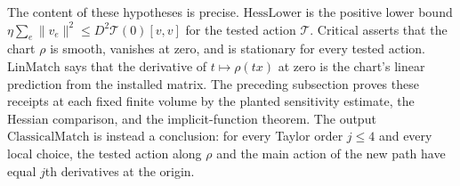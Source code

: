 The content of these hypotheses is precise. $\mathrm{HessLower}$ is the
positive lower bound
$\eta\sum_e\|v_e\|^2\leq D^2\mathcal T(0)[v,v]$ for the tested action
$\mathcal T$.
$\mathrm{Critical}$ asserts that the chart $\rho$ is smooth, vanishes at
zero, and is stationary for every tested action. $\mathrm{LinMatch}$ says
that the derivative of $t\mapsto\rho(tx)$ at zero is the chart's linear
prediction from the installed matrix. The preceding subsection proves these
receipts at each fixed finite volume by the planted sensitivity estimate,
the Hessian comparison, and the implicit-function theorem. The output
$\mathrm{ClassicalMatch}$ is instead a conclusion: for every Taylor order
$j\leq4$ and every local choice, the tested action along $\rho$ and the
main action of the new path have equal $j$th derivatives at the origin.

